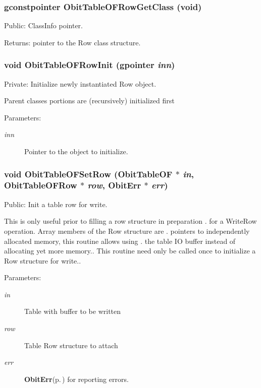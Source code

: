 \subsubsection{\setlength{\rightskip}{0pt plus 5cm}gconstpointer Obit\-Table\-OFRow\-Get\-Class (void)}\label{ObitTableOF_8c_a15}


Public: Class\-Info pointer. 

\begin{Desc}
\item[Returns:]pointer to the Row class structure. \end{Desc}
\subsubsection{\setlength{\rightskip}{0pt plus 5cm}void Obit\-Table\-OFRow\-Init (gpointer {\em inn})}\label{ObitTableOF_8c_a6}


Private: Initialize newly instantiated Row object. 

Parent classes portions are (recursively) initialized first \begin{Desc}
\item[Parameters:]
\begin{description}
\item[{\em inn}]Pointer to the object to initialize. \end{description}
\end{Desc}
\subsubsection{\setlength{\rightskip}{0pt plus 5cm}void Obit\-Table\-OFSet\-Row ({\bf Obit\-Table\-OF} $\ast$ {\em in}, {\bf Obit\-Table\-OFRow} $\ast$ {\em row}, {\bf Obit\-Err} $\ast$ {\em err})}\label{ObitTableOF_8c_a23}


Public: Init a table row for write. 

This is only useful prior to filling a row structure in preparation . for a Write\-Row operation. Array members of the Row structure are . pointers to independently allocated memory, this routine allows using . the table IO buffer instead of allocating yet more memory.. This routine need only be called once to initialize a Row structure for write.. \begin{Desc}
\item[Parameters:]
\begin{description}
\item[{\em in}]Table with buffer to be written \item[{\em row}]Table Row structure to attach \item[{\em err}]{\bf Obit\-Err}{\rm (p.\,\pageref{structObitErr})} for reporting errors. \end{description}
\end{Desc}

